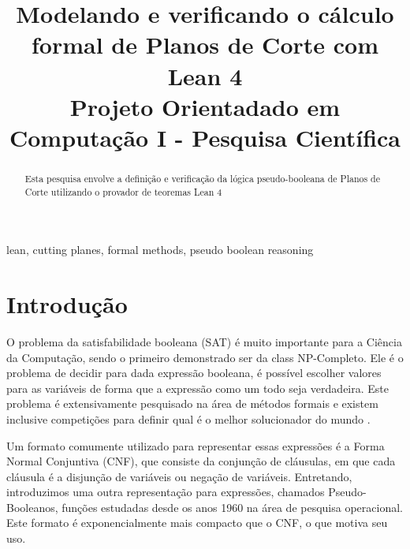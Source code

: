 \documentclass[conference]{IEEEtran}
\begin{document}
\title{Modelando e verificando o cálculo formal de Planos de Corte com Lean 4\\
{\footnotesize Projeto Orientadado em Computação I - Pesquisa Científica}
}

\author{
}

\maketitle

\begin{abstract}
    Esta pesquisa envolve a definição e verificação da lógica pseudo-booleana de
    Planos de Corte utilizando o provador de teoremas Lean 4

\end{abstract}

\begin{IEEEkeywords}
    lean, cutting planes, formal methods, pseudo boolean reasoning
\end{IEEEkeywords}

\section{Introdução}
O problema da satisfabilidade booleana (SAT) é muito importante para a Ciência da Computação, sendo o
primeiro demonstrado ser da class NP-Completo. Ele é o problema de decidir para dada expressão booleana, é
possível escolher valores para as variáveis de forma que a expressão como um todo seja verdadeira.
Este problema é extensivamente pesquisado na área de métodos formais\cite{SatLive} e existem inclusive competições para
definir qual é o melhor solucionador do mundo \cite{SatComp}.

Um formato comumente utilizado para representar essas expressões é a Forma Normal Conjuntiva (CNF), que
consiste da conjunção de cláusulas, em que cada cláusula é a disjunção de variáveis ou negação de variáveis.
Entretando, introduzimos uma outra representação para expressões, chamados Pseudo-Booleanos, funções estudadas
desde os anos 1960 na área de pesquisa operacional.
Este formato é exponencialmente mais compacto que o CNF, o que motiva seu uso\cite{PBSolve}.
\end{document}
